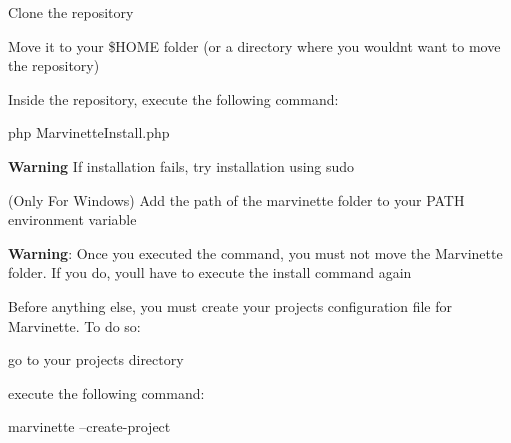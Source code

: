 \href{images/logo.PNG}{\tt }

\href{https://github.com/Arthi-chaud/Marvinette/actions/workflows/unit_tests.yml}{\tt } \href{https://sonarcloud.io/dashboard?id=Arthi-chaud_Marvinette}{\tt } \href{https://sonarcloud.io/dashboard?id=Arthi-chaud_Marvinette}{\tt } \href{https://arthi-chaud.github.io/Marvinette/}{\tt } 




\begin{DoxyEnumerate}
\item Clone the repository
\item Move it to your {\ttfamily \$\+H\+O\+ME} folder (or a directory where you wouldn\textquotesingle{}t want to move the repository)
\item Inside the repository, execute the following command\+:
\end{DoxyEnumerate}


\begin{DoxyCode}
php MarvinetteInstall.php
\end{DoxyCode}


{\bfseries Warning} If installation fails, try installation using {\ttfamily sudo}


\begin{DoxyEnumerate}
\item (Only For Windows) Add the path of the marvinette folder to your {\ttfamily P\+A\+TH} environment variable
\end{DoxyEnumerate}

{\bfseries Warning}\+: Once you executed the command, you must not move the Marvinette folder. If you do, you\textquotesingle{}ll have to execute the install command again 




\begin{DoxyEnumerate}
\item Before anything else, you must create your project\textquotesingle{}s configuration file for Marvinette. To do so\+:
\begin{DoxyItemize}
\item go to your project\textquotesingle{}s directory
\item execute the following command\+:
\end{DoxyItemize}
\end{DoxyEnumerate}


\begin{DoxyCode}
marvinette --create-project
\end{DoxyCode}



